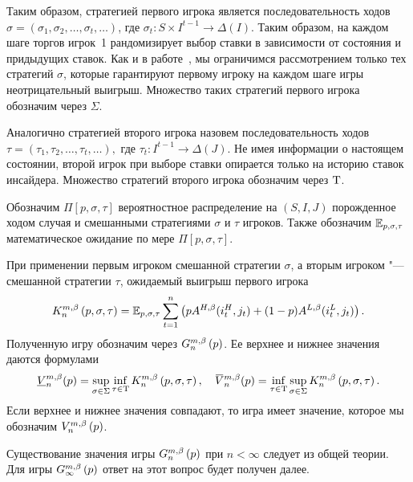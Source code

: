 Таким образом, стратегией первого игрока является последовательность ходов
$\sigma = (\sigma_1, \sigma_2, \ldots, \sigma_t, \ldots)$, где $\sigma_t: S
\times I^{t-1} \rightarrow \Delta(I)$. Таким образом, на каждом шаге торгов
игрок~1 рандомизирует выбор ставки в зависимости от состояния и придыдущих
ставок. Как и в работе~\cite{domansky07}, мы ограничимся рассмотрением только
тех стратегий $\sigma$, которые гарантируют первому игроку на каждом шаге игры
неотрицательный выигрыш. Множество таких стратегий первого игрока обозначим
через $\Sigma$.

Аналогично стратегией второго игрока назовем последовательность ходов $\tau =
(\tau_1, \tau_2, \ldots, \tau_t, \ldots),$ где $\tau_t: I^{t-1} \rightarrow
\Delta(J)$. Не имея информации о настоящем состоянии, второй игрок при выборе
ставки опирается только на историю ставок инсайдера. Множество стратегий второго
игрока обозначим через $\mathrm{T}$.

Обозначим $\Pi[p, \sigma, \tau]$ вероятностное распределение на $(S, I, J)$
порожденное ходом случая и смешанными стратегиями $\sigma$ и $\tau$ игроков.
Также обозначим $\operatorname{\mathbb{E}}_{p,\sigma,\tau}$ математическое ожидание по мере $\Pi[p,
\sigma, \tau]$.

При применении первым игроком смешанной стратегии $\sigma$, а вторым игроком
"--- смешанной стратегии $\tau$, ожидаемый выигрыш первого игрока
\begin{equation}
  \label{eq:firstPlayerPayoff}
  K_{n}^{m,\beta}\left({p}, {\sigma}, {\tau}\right) = \operatorname{\mathbb{E}}_{p,\sigma,\tau} \sum_{t=1}^n
  \left(
    pA^{H,\beta}(i_t^H, j_t) + (1 - p)A^{L,\beta}(i_t^L, j_t)
  \right).
\end{equation}
Полученную игру обозначим через $G_{n}^{m, \beta}\left({p}\right)$. Ее верхнее и нижнее
значения даются формулами
\begin{equation*}
  \underline{V}^{m,\Co}_n(p) = \sup_{\sigma \in \Sigma} \inf_{\tau \in \Tau}
  \firstPlayerPayoff{n}{p}{\sigma}{\tau}, \quad
  \overbar{V}^{m,\Co}_n(p) = \inf_{\tau \in \Tau} \sup_{\sigma \in \Sigma}
  \firstPlayerPayoff{n}{p}{\sigma}{\tau}.
\end{equation*}
Если верхнее и нижнее значения совпадают, то игра имеет значение, которое мы
обозначим $V_{n}^{m,\beta}\left({p}\right)$.

\begin{remark}
  Существование значения игры $G_{n}^{m, \beta}\left({p}\right)$ при $n < \infty$ следует из
  общей теории. Для игры $G_{\infty}^{m, \beta}\left({p}\right)$ ответ на этот вопрос будет
  получен далее.
\end{remark}

